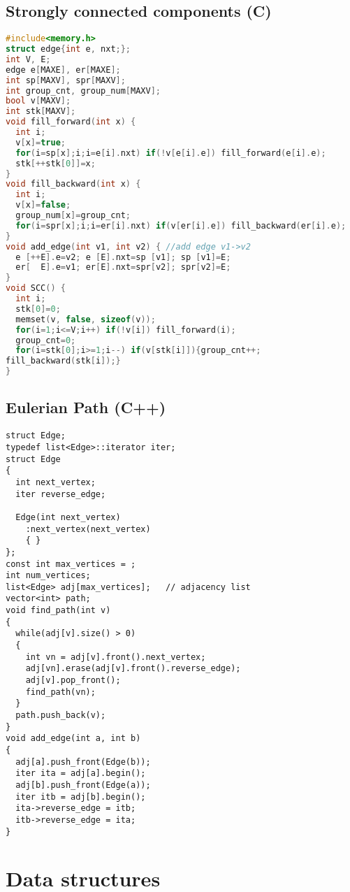 \subsection{Strongly connected components (C)}
\begin{lstlisting}[language=C++]
#include<memory.h>
struct edge{int e, nxt;};
int V, E;
edge e[MAXE], er[MAXE];
int sp[MAXV], spr[MAXV];
int group_cnt, group_num[MAXV];
bool v[MAXV];
int stk[MAXV];
void fill_forward(int x) {
  int i;
  v[x]=true;
  for(i=sp[x];i;i=e[i].nxt) if(!v[e[i].e]) fill_forward(e[i].e);
  stk[++stk[0]]=x;
}
void fill_backward(int x) {
  int i;
  v[x]=false;
  group_num[x]=group_cnt;
  for(i=spr[x];i;i=er[i].nxt) if(v[er[i].e]) fill_backward(er[i].e);
}
void add_edge(int v1, int v2) { //add edge v1->v2
  e [++E].e=v2; e [E].nxt=sp [v1]; sp [v1]=E;
  er[  E].e=v1; er[E].nxt=spr[v2]; spr[v2]=E;
}
void SCC() {
  int i;
  stk[0]=0;
  memset(v, false, sizeof(v));
  for(i=1;i<=V;i++) if(!v[i]) fill_forward(i);
  group_cnt=0;
  for(i=stk[0];i>=1;i--) if(v[stk[i]]){group_cnt++; 
fill_backward(stk[i]);}
}
\end{lstlisting}
\subsection{Eulerian Path (C++)}
\begin{lstlisting}
struct Edge;
typedef list<Edge>::iterator iter;
struct Edge
{
  int next_vertex;
  iter reverse_edge;

  Edge(int next_vertex)
    :next_vertex(next_vertex)
    { }
};
const int max_vertices = ;
int num_vertices;
list<Edge> adj[max_vertices];   // adjacency list
vector<int> path;
void find_path(int v)
{
  while(adj[v].size() > 0)
  {
    int vn = adj[v].front().next_vertex;
    adj[vn].erase(adj[v].front().reverse_edge);
    adj[v].pop_front();
    find_path(vn);
  }
  path.push_back(v);
}
void add_edge(int a, int b)
{
  adj[a].push_front(Edge(b));
  iter ita = adj[a].begin();
  adj[b].push_front(Edge(a));
  iter itb = adj[b].begin();
  ita->reverse_edge = itb;
  itb->reverse_edge = ita;
}
\end{lstlisting}
\section{Data structures}
